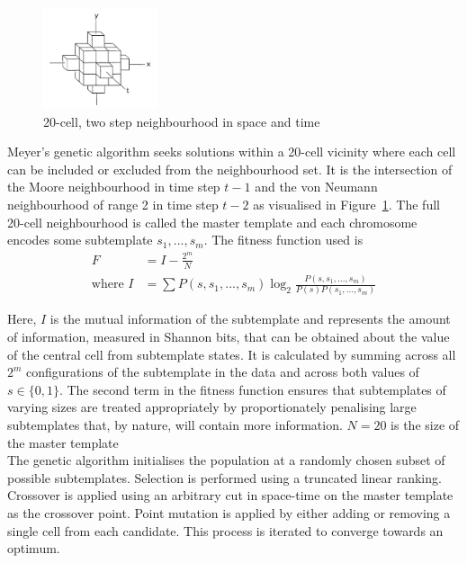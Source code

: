 \begin{figure}[!h]
\centering
\includegraphics[width=0.3\textwidth]{images/20_neighbourhood.png}
\caption{20-cell, two step neighbourhood in space and time}
\label{fig:20-near}
\end{figure}

Meyer's genetic algorithm seeks solutions within a 20-cell vicinity where each cell can be included or excluded from the neighbourhood set. It is the intersection of the Moore neighbourhood in time step $t-1$ and the von Neumann neighbourhood of range 2 in time step $t-2$ as visualised in Figure~\ref{fig:20-near}. The full 20-cell neighbourhood is called the master template and each chromosome encodes some subtemplate ${s_1, ..., s_m}$. The fitness function used is
\begin{align*}
                    F &= I - \frac{2^m}{N}\\
    \text{where\ }  I &= \sum P(s, s_1, ..., s_m)\log_2{\frac{P(s, s_1, ..., s_m)}{P(s)P(s_1, ..., s_m)}}
\end{align*}

Here, $I$ is the mutual information of the subtemplate and represents the amount of information, measured in Shannon bits, that can be obtained about the value of the central cell from subtemplate states. It is calculated by summing across all $2^m$ configurations of the subtemplate in the data and across both values of $s \in \{0,1\}$. The second term in the fitness function ensures that subtemplates of varying sizes are treated appropriately by proportionately penalising large subtemplates that, by nature, will contain more information. $N=20$ is the size of the master template\\

The genetic algorithm initialises the population at a randomly chosen subset of possible subtemplates. Selection is performed using a truncated linear ranking. Crossover is applied using an arbitrary cut in space-time on the master template as the crossover point. Point mutation is applied by either adding or removing a single cell from each candidate. This process is iterated to converge towards an optimum.\\

